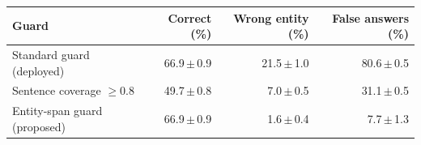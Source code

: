 \begin{tabular}{lrrr}
\toprule
Guard & Correct (\%) & Wrong entity (\%) & False answers (\%)\\
\midrule
Standard guard (deployed) & 66.9\,$\pm$\,0.9 & 21.5\,$\pm$\,1.0 & 80.6\,$\pm$\,0.5\\
Sentence coverage $\geq 0.8$ & 49.7\,$\pm$\,0.8 & 7.0\,$\pm$\,0.5 & 31.1\,$\pm$\,0.5\\
Entity-span guard (proposed) & 66.9\,$\pm$\,0.9 & 1.6\,$\pm$\,0.4 & 7.7\,$\pm$\,1.3\\
\bottomrule
\end{tabular}

